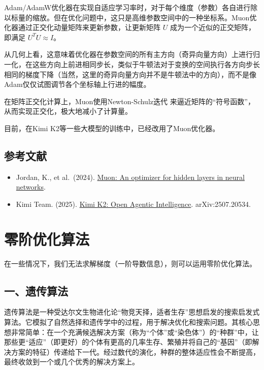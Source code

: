 Adam/AdamW优化器在实现自适应学习率时，对于每个维度（参数）各自进行除以标量的缩放。但在优化问题中，这只是高维参数空间中的一种坐标系。Muon优化器通过正交化动量矩阵来更新参数，让更新矩阵 \(U\) 成为一个近似的正交矩阵，即满足 \(U^{T}U\approx I\)。

从几何上看，这意味着优化器在参数空间的所有主方向（奇异向量方向）上进行归一化，在这些方向上前进相同步长，类似于牛顿法对于变换的空间执行各方向步长相同的梯度下降（当然，这里的奇异向量方向并不是牛顿法中的方向），而不是像Adam仅仅试图调节各个坐标轴上行进的幅度。

在矩阵正交化计算上，Muon使用Newton-Schulz迭代 来逼近矩阵的``符号函数''，从而实现正交化，极大地减小了计算量。

目前，在Kimi K2等一些大模型的训练中，已经改用了Muon优化器。

\hypertarget{ux53c2ux8003ux6587ux732e-28}{%
\subsection{参考文献}\label{ux53c2ux8003ux6587ux732e-28}}

\begin{itemize}
\tightlist
\item
  Jordan, K., et al.~(2024). \href{https://kellerjordan.github.io/posts/muon/}{Muon: An optimizer for hidden layers in neural networks}.
\item
  Kimi Team. (2025). \href{https://arxiv.org/abs/2507.20534}{Kimi K2: Open Agentic Intelligence}. arXiv:2507.20534.
\end{itemize}

\clearpage

\hypertarget{ux96f6ux9636ux4f18ux5316ux7b97ux6cd5}{%
\section{零阶优化算法}\label{ux96f6ux9636ux4f18ux5316ux7b97ux6cd5}}

在一些情况下，我们无法求解梯度（一阶导数信息），则可以运用零阶优化算法。

\hypertarget{ux4e00ux9057ux4f20ux7b97ux6cd5}{%
\subsection{一、遗传算法}\label{ux4e00ux9057ux4f20ux7b97ux6cd5}}

遗传算法是一种受达尔文生物进化论``物竞天择，适者生存''思想启发的搜索启发式算法。它模拟了自然选择和遗传学中的过程，用于解决优化和搜索问题。其核心思想非常简单：在一个充满候选解决方案（称为``个体''或``染色体''）的``种群''中，让那些更``适应''（即更好）的个体有更高的几率生存、繁殖并将自己的``基因''（即解决方案的特征）传递给下一代。经过数代的演化，种群的整体适应性会不断提高，最终收敛到一个或几个优秀的解决方案上。

